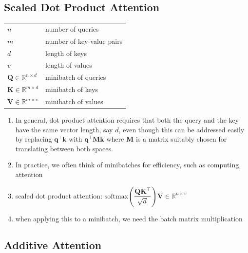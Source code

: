 \subsection{Scaled Dot Product Attention \cite{dnn-1}}

\begin{customTableWrapper}{1.5}
\begin{longtable}{l p{8cm}}
    $n$ & number of queries \\

    $m$ & number of key-value pairs \\

    $d$ & length of keys \\

    $v$ & length of values \\

    \hline

    $\mathbf Q\in\mathbb R^{n\times d}$ & minibatch of queries \\
    $\mathbf K\in\mathbb R^{m\times d}$ & minibatch of keys \\
    $\mathbf V\in\mathbb R^{m\times v}$ & minibatch of values \\
\end{longtable}
\end{customTableWrapper}

\begin{enumerate}
    \item In general, dot product attention requires that both the query and the key have the same vector length, say $d$, even though this can be addressed easily by replacing $\mathbf{q}^\top \mathbf{k}$ with $\mathbf{q}^\top \mathbf{M} \mathbf{k}$ where $\mathbf{M}$ is a matrix suitably chosen for translating between both spaces.

    \item In practice, we often think of minibatches for efficiency, such as computing attention

    \item scaled dot product attention: $\mathrm{softmax}\left(\dfrac{\mathbf Q \mathbf K^\top }{\sqrt{d}}\right) \mathbf V \in \mathbb{R}^{n\times v}$

    \item when applying this to a minibatch, we need the batch matrix multiplication
\end{enumerate}

\subsection{Additive Attention \cite{dnn-1}}

